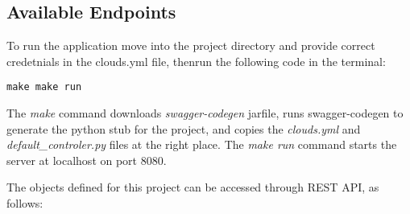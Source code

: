 \subsection{Available Endpoints}
To run the application move into the project directory and provide
correct credetnials in the clouds.yml file, thenrun the following code
in the terminal:
\begin{verbatim}
make make run
\end{verbatim}
The \emph{make} command downloads \emph{swagger-codegen} jarfile, runs
swagger-codegen to generate the python stub for the project, and
copies the \emph{clouds.yml} and \emph{default\_controler.py} files at
the right place. The \emph{make run} command starts the server at
localhost on port 8080.

The objects defined for this project can be accessed through REST API,
as follows:
